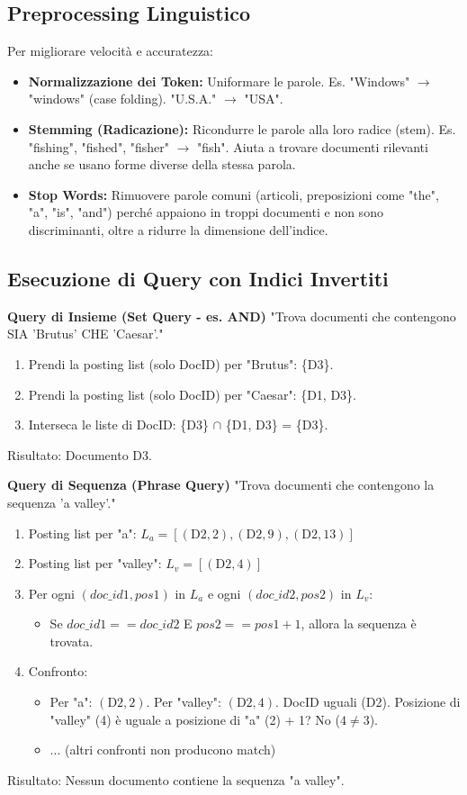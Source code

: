 \subsection{Preprocessing Linguistico}
Per migliorare velocità e accuratezza:
\begin{itemize}
    \item \textbf{Normalizzazione dei Token:} Uniformare le parole. Es. "Windows" $\rightarrow$ "windows" (case folding). "U.S.A." $\rightarrow$ "USA".
    \item \textbf{Stemming (Radicazione):} Ricondurre le parole alla loro radice (stem). Es. "fishing", "fished", "fisher" $\rightarrow$ "fish". Aiuta a trovare documenti rilevanti anche se usano forme diverse della stessa parola.
    \item \textbf{Stop Words:} Rimuovere parole comuni (articoli, preposizioni come "the", "a", "is", "and") perché appaiono in troppi documenti e non sono discriminanti, oltre a ridurre la dimensione dell'indice.
\end{itemize}

\subsection{Esecuzione di Query con Indici Invertiti}

\textbf{Query di Insieme (Set Query - es. AND)}
"Trova documenti che contengono SIA 'Brutus' CHE 'Caesar'."
\begin{enumerate}
    \item Prendi la posting list (solo DocID) per "Brutus": \{D3\}.
    \item Prendi la posting list (solo DocID) per "Caesar": \{D1, D3\}.
    \item Interseca le liste di DocID: \{D3\} $\cap$ \{D1, D3\} = \{D3\}.
\end{enumerate}
Risultato: Documento D3.

\textbf{Query di Sequenza (Phrase Query)}
"Trova documenti che contengono la sequenza 'a valley'."
\begin{enumerate}
    \item Posting list per "a": $L_a = [(\text{D2},2), (\text{D2},9), (\text{D2},13)]$
    \item Posting list per "valley": $L_v = [(\text{D2},4)]$
    \item Per ogni $(doc\_id1, pos1)$ in $L_a$ e ogni $(doc\_id2, pos2)$ in $L_v$:
    \begin{itemize}
        \item Se $doc\_id1 == doc\_id2$ E $pos2 == pos1 + 1$, allora la sequenza è trovata.
    \end{itemize}
    \item Confronto:
    \begin{itemize}
        \item Per "a": $(\text{D2},2)$. Per "valley": $(\text{D2},4)$. DocID uguali (D2). Posizione di "valley" (4) è uguale a posizione di "a" (2) + 1? No ($4 \ne 3$).
        \item ... (altri confronti non producono match)
    \end{itemize}
\end{enumerate}
Risultato: Nessun documento contiene la sequenza "a valley".

